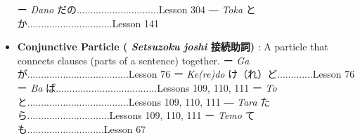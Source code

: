 \begin{itemize}
ー \emph{Dano }だの\dothyp{}\dothyp{}\dothyp{}\dothyp{}\dothyp{}\dothyp{}\dothyp{}\dothyp{}\dothyp{}\dothyp{}\dothyp{}\dothyp{}\dothyp{}\dothyp{}\dothyp{}\dothyp{}\dothyp{}\dothyp{}\dothyp{}\dothyp{}\dothyp{}\dothyp{}\dothyp{}\dothyp{}\dothyp{}\dothyp{}\dothyp{}\dothyp{}\dothyp{}\dothyp{}Lesson 304 \hfill\break
― \emph{Toka }とか\dothyp{}\dothyp{}\dothyp{}\dothyp{}\dothyp{}\dothyp{}\dothyp{}\dothyp{}\dothyp{}\dothyp{}\dothyp{}\dothyp{}\dothyp{}\dothyp{}\dothyp{}\dothyp{}\dothyp{}\dothyp{}\dothyp{}\dothyp{}\dothyp{}\dothyp{}\dothyp{}\dothyp{}\dothyp{}\dothyp{}\dothyp{}\dothyp{}\dothyp{}\dothyp{}.Lesson 141 \hfill\break
\hfill\break

\item \textbf{Conjunctive Particle ( \emph{Setsuzoku joshi }接続助詞) }: A particle that connects clauses (parts of a sentence) together. \hfill\break
\hfill\break
ー \emph{Ga }が\dothyp{}\dothyp{}\dothyp{}\dothyp{}\dothyp{}\dothyp{}\dothyp{}\dothyp{}\dothyp{}\dothyp{}\dothyp{}\dothyp{}\dothyp{}\dothyp{}\dothyp{}\dothyp{}\dothyp{}\dothyp{}\dothyp{}\dothyp{}\dothyp{}\dothyp{}\dothyp{}\dothyp{}\dothyp{}\dothyp{}\dothyp{}\dothyp{}\dothyp{}\dothyp{}\dothyp{}\dothyp{}\dothyp{}\dothyp{}\dothyp{}\dothyp{}.Lesson 76 \hfill\break
ー \emph{Ke(re)do }け（れ）ど\dothyp{}\dothyp{}\dothyp{}\dothyp{}\dothyp{}\dothyp{}\dothyp{}\dothyp{}\dothyp{}\dothyp{}\dothyp{}\dothyp{}.Lesson 76 \hfill\break
ー \emph{Ba }ば\dothyp{}\dothyp{}\dothyp{}\dothyp{}\dothyp{}\dothyp{}\dothyp{}\dothyp{}\dothyp{}\dothyp{}\dothyp{}\dothyp{}\dothyp{}\dothyp{}\dothyp{}\dothyp{}\dothyp{}\dothyp{}\dothyp{}\dothyp{}\dothyp{}\dothyp{}\dothyp{}\dothyp{}\dothyp{}\dothyp{}\dothyp{}\dothyp{}\dothyp{}\dothyp{}\dothyp{}\dothyp{}\dothyp{}\dothyp{}\dothyp{}\dothyp{}.Lessons 109, 110, 111 \hfill\break
ー \emph{To }と\dothyp{}\dothyp{}\dothyp{}\dothyp{}\dothyp{}\dothyp{}\dothyp{}\dothyp{}\dothyp{}\dothyp{}\dothyp{}\dothyp{}\dothyp{}\dothyp{}\dothyp{}\dothyp{}\dothyp{}\dothyp{}\dothyp{}\dothyp{}\dothyp{}\dothyp{}\dothyp{}\dothyp{}\dothyp{}\dothyp{}\dothyp{}\dothyp{}\dothyp{}\dothyp{}\dothyp{}\dothyp{}\dothyp{}\dothyp{}\dothyp{}\dothyp{}.Lessons 109, 110, 111 \hfill\break
― \emph{Tara }たら\dothyp{}\dothyp{}\dothyp{}\dothyp{}\dothyp{}\dothyp{}\dothyp{}\dothyp{}\dothyp{}\dothyp{}\dothyp{}\dothyp{}\dothyp{}\dothyp{}\dothyp{}\dothyp{}\dothyp{}\dothyp{}\dothyp{}\dothyp{}\dothyp{}\dothyp{}\dothyp{}\dothyp{}\dothyp{}\dothyp{}\dothyp{}\dothyp{}\dothyp{}\dothyp{}Lessons 109, 110, 111 \hfill\break
ー \emph{Temo }ても\dothyp{}\dothyp{}\dothyp{}\dothyp{}\dothyp{}\dothyp{}\dothyp{}\dothyp{}\dothyp{}\dothyp{}\dothyp{}\dothyp{}\dothyp{}\dothyp{}\dothyp{}\dothyp{}\dothyp{}\dothyp{}\dothyp{}\dothyp{}\dothyp{}\dothyp{}\dothyp{}\dothyp{}\dothyp{}\dothyp{}\dothyp{}.Lesson 67 \hfill\break

\end{itemize}
